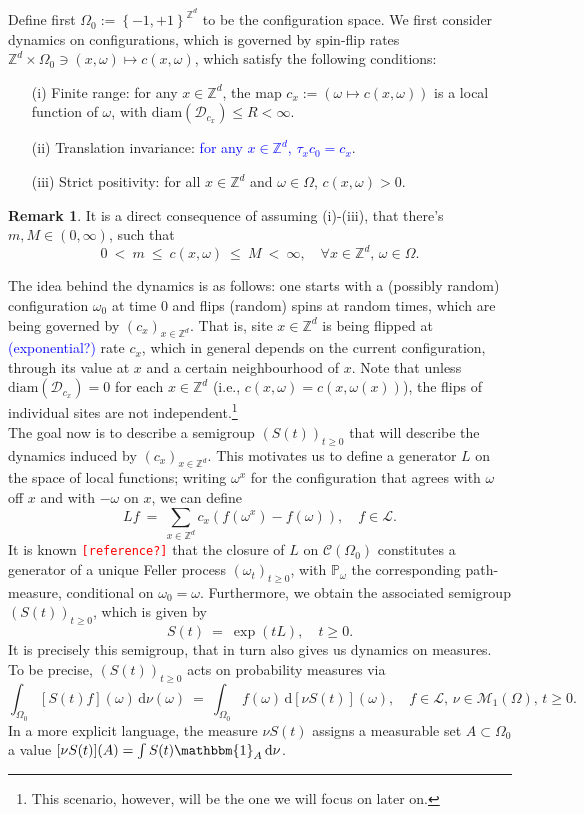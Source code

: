 \documentclass[12pt]{article}
\newcommand{\D}{\mathcal{D}}
\renewcommand{\d}{\mathrm{d}}
\newcommand{\Loc}{\mathcal{L}}
\newcommand{\M}{\mathcal{M}}
\renewcommand{\P}{\mathbb{P}}
\newcommand{\Z}{\mathbb{Z}}
\newcommand{\set}[1]{\left\{#1\right\}}
\newcommand{\1}{\mathbbm{1}}
\newcommand{\5}{\vspace{0.5cm}}
\theoremstyle{definition}
\newtheorem{rem}[thm]{Remark}
\begin{document}
Define first $\Omega_0:=\set{-1,+1}^{\Z^d}$ to be the configuration space. We first consider dynamics on configurations, which is governed by spin-flip rates $\Z^d\times\Omega_0\ni(x,\omega)\mapsto c(x,\omega)$, which satisfy the following conditions:
\begin{itemize}
	\item[(i)] Finite range: for any $x\in\Z^d$, the map $c_x:=(\omega\mapsto c(x,\omega))$ is a local function of $\omega$, with $\mathrm{diam}(\D_{c_x})\leq R<\infty$.
	\item[(ii)] Translation invariance: \textcolor{blue}{for any $x\in\Z^d$, $\tau_x c_0=c_x$}. %
	\item[(iii)] Strict positivity: for all $x\in\Z^d$ and $\omega\in\Omega$, $c(x,\omega)>0$.
\end{itemize}

\begin{rem}
It is a direct consequence of assuming (i)-(iii), that there's $m,M\in(0,\infty)$, such that 
$$0 ~<~ m ~\leq~ c(x,\omega) ~\leq~ M ~<~ \infty, \quad \forall x\in\Z^d,\,\omega\in\Omega.$$
\end{rem}

The idea behind the dynamics is as follows: one starts with a (possibly random) configuration $\omega_0$ at time $0$ and flips (random) spins at random times, which are being governed by $(c_x)_{x\in\Z^d}$. That is, site $x\in\Z^d$ is being flipped at \textcolor{blue}{(exponential?)} rate $c_x$, which in general depends on the current configuration, through its value at $x$ and a certain neighbourhood of $x$. Note that unless $\mathrm{diam}(\D_{c_x})=0$ for each $x\in\Z^d$ (i.e., $c(x,\omega)=c(x,\omega(x))$), the flips of individual sites are not independent.\footnote{This scenario, however, will be the one we will focus on later on.} \\

The goal now is to describe a semigroup $(S(t))_{t\geq 0}$ that will describe the dynamics induced by $(c_x)_{x\in\Z^d}$. This motivates us to define a generator $L$ on the space of local functions; writing $\omega^x$ for the configuration that agrees with $\omega$ off $x$ and with $-\omega$ on $x$, we can define
$$Lf ~=~ \sum_{x\in\Z^d}c_x(f(\omega^x)-f(\omega)), \quad f\in\Loc.$$ It is known \textcolor{red}{\texttt{[reference?]}} that the closure of $L$ on $\mathcal{C}(\Omega_0)$ constitutes a generator of a unique Feller process $(\omega_t)_{t\geq 0}$, with $\P_\omega$ the corresponding path-measure, conditional on $\omega_0=\omega$. Furthermore, we obtain the associated semigroup $(S(t))_{t\geq 0}$, which is given by
$$S(t) ~=~ \exp(tL), \quad t\geq 0.$$
It is precisely this semigroup, that in turn also gives us dynamics on measures. To be precise, $(S(t))_{t\geq 0}$ acts on probability measures via	
$$\int_{\Omega_0} [S(t)f](\omega)\,\d\nu(\omega) ~=~ \int_{\Omega_0}f(\omega)\,\d[\nu S(t)](\omega), \quad f\in\Loc,\,\nu\in\M_1(\Omega),\,t\geq 0.$$
In a more explicit language, the measure $\nu S(t)$ assigns a measurable set $A\subset\Omega_0$ a value $[\nu S(t)](A)=\int S(t)\1_A\,\d\nu$. \\
\end{document}
